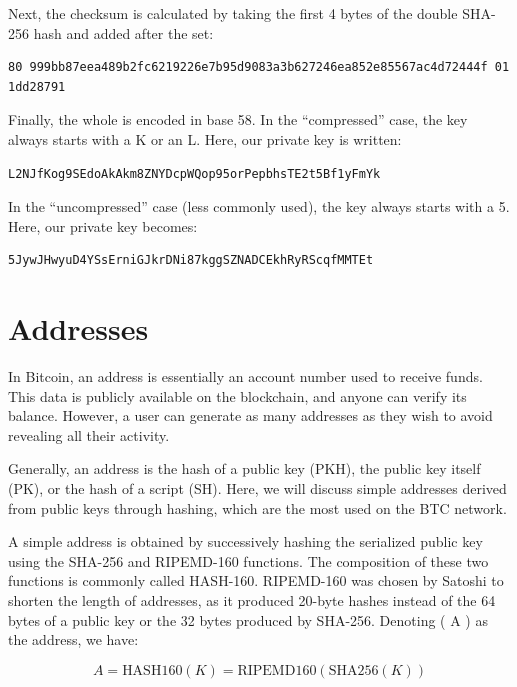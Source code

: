 \documentclass[
  a5paper,
  smalldemyvopaper,10pt,twoside,onecolumn,openright,extrafontsizes,hidelinks]{memoir}
\begin{document}
Next, the checksum is calculated by taking the first 4 bytes of the
double SHA-256 hash and added after the set:

\begin{verbatim}
80 999bb87eea489b2fc6219226e7b95d9083a3b627246ea852e85567ac4d72444f 01
1dd28791
\end{verbatim}

Finally, the whole is encoded in base 58. In the ``compressed'' case,
the key always starts with a K or an L. Here, our private key is
written:

\begin{verbatim}
L2NJfKog9SEdoAkAkm8ZNYDcpWQop95orPepbhsTE2t5Bf1yFmYk
\end{verbatim}

In the ``uncompressed'' case (less commonly used), the key always starts
with a 5. Here, our private key becomes:

\begin{verbatim}
5JywJHwyuD4YSsErniGJkrDNi87kggSZNADCEkhRyRScqfMMTEt
\end{verbatim}

\section*{Addresses}\label{addresses}


In Bitcoin, an address is essentially an account number used to receive
funds. This data is publicly available on the blockchain, and anyone can
verify its balance. However, a user can generate as many addresses as
they wish to avoid revealing all their activity.

Generally, an address is the hash of a public key (PKH), the public key
itself (PK), or the hash of a script (SH). Here, we will discuss simple
addresses derived from public keys through hashing, which are the most
used on the BTC network.

A simple address is obtained by successively hashing the serialized
public key using the SHA-256 and RIPEMD-160 functions. The composition
of these two functions is commonly called HASH-160. RIPEMD-160 was
chosen by Satoshi to shorten the length of addresses, as it produced
20-byte hashes instead of the 64 bytes of a public key or the 32 bytes
produced by SHA-256. Denoting ( A ) as the address, we have:

\[A = \text{HASH160}(K) = \text{RIPEMD160}(\text{SHA256}(K))\]
\end{document}
